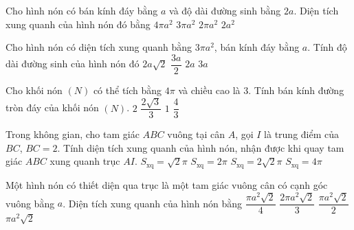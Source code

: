 \begin{ex}
	Cho hình nón có bán kính đáy bằng $a$ và độ dài đường sinh bằng $2a$. Diện tích xung quanh của hình nón đó bằng
	\choice
	{$4\pi a^2$}
	{$3\pi a^2$}
	{\True $2\pi a^2$}
	{$2a^2$}
\end{ex}
\begin{ex}
	Cho hình nón có diện tích xung quanh bằng $3\pi a^2$, bán kính đáy bằng $a$. Tính độ dài đường sinh của hình nón đó
	\choice
	{$2a\sqrt{2}$}
	{$\dfrac{3a}{2}$}
	{$2a$}
	{\True $3a$}
\end{ex}
\begin{ex}
	Cho khối nón $(N)$ có thể tích bằng $4\pi$ và chiều cao là $3$. Tính bán kính đường tròn đáy của khối nón $(N)$. 
	\choice
	{\True $2$}
	{$\dfrac{2\sqrt{3}}{3}$}
	{$1$}
	{$\dfrac{4}{3}$}
\end{ex}
\begin{ex}
	Trong không gian, cho tam giác $ABC$ vuông tại cân $A$, gọi $I$ là trung điểm của $BC$, $BC=2$. Tính diện tích xung quanh của hình nón, nhận được khi quay tam giác $ABC$ xung quanh trục $AI$. 
	\choice
	{\True $S_{\mathrm{xq}}=\sqrt{2}\pi$}
	{$S_{\mathrm{xq}}=2\pi$}
	{$S_{\mathrm{xq}}=2\sqrt{2}\pi$}
	{$S_{\mathrm{xq}}=4\pi$}
\end{ex}
\begin{ex}
	Một hình nón có thiết diện qua trục là một tam giác vuông cân có cạnh góc vuông bằng $a$. Diện tích xung quanh của hình nón bằng
	\choice
	{$\dfrac{\pi a^2\sqrt{2}}{4}$}
	{$\dfrac{2\pi a^2\sqrt{2}}{3}$}
	{\True $\dfrac{\pi a^2\sqrt{2}}{2}$}
	{$\pi a^2\sqrt{2}$}
\end{ex}
